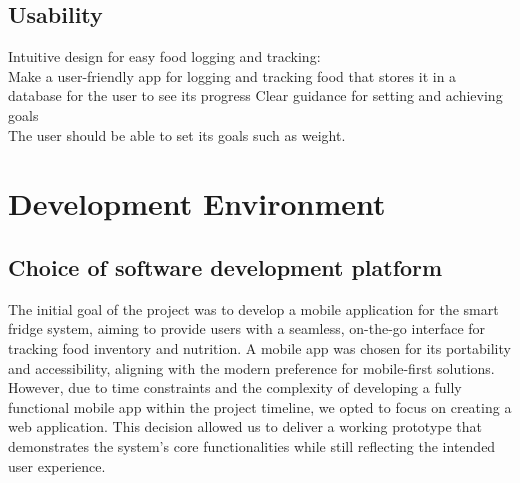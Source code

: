 \documentclass[conference]{IEEEtran}
\begin{document}
\subsection{Usability}
Intuitive design for easy food logging and tracking:\\
Make a user-friendly app for logging and tracking food that stores it in a database for the user to see its progress
Clear guidance for setting and achieving goals\\
The user should be able to set its goals such as weight.

\section{Development Environment}
\subsection{Choice of software development platform}
The initial goal of the project was to develop a mobile application for the smart fridge system, aiming to provide users with a seamless, on-the-go interface for tracking food inventory and nutrition. A mobile app was chosen for its portability and accessibility, aligning with the modern preference for mobile-first solutions.
However, due to time constraints and the complexity of developing a fully functional mobile app within the project timeline, we opted to focus on creating a web application. This decision allowed us to deliver a working prototype that demonstrates the system's core functionalities while still reflecting the intended user experience.
\end{document}
